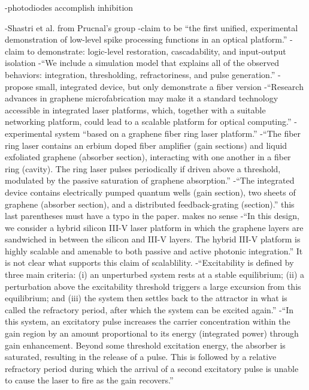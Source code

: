 \cite{shna2015}
-photodiodes accomplish inhibition

\cite{shna2016}
-Shastri et al. from Prucnal's group
-claim to be ``the first unified, experimental demonstration of low-level spike processing functions in an optical platform.''
-claim to demonstrate: logic-level restoration, cascadability, and input-output isolation
-``We include a simulation model that explains all of the observed behaviors: integration, thresholding, refractoriness, and pulse generation.''
-propose small, integrated device, but only demonstrate a fiber version
-``Research advances in graphene microfabrication may make it a standard technology accessible in integrated laser platforms, which, together with a suitable networking platform, could lead to a scalable platform for optical computing.''
-experimental system ``based on a graphene fiber ring laser platform.''
-``The fiber ring laser contains an erbium doped fiber amplifier (gain sections) and liquid exfoliated graphene (absorber section), interacting with one another in a fiber ring (cavity). The ring laser pulses periodically if driven above a threshold, modulated by the passive saturation of graphene absorption.''
-``The integrated device contains electrically pumped quantum wells (gain section), two sheets of graphene (absorber section), and a distributed feedback-grating (section).'' this last parentheses must have a typo in the paper. makes no sense
-``In this design, we consider a hybrid silicon III-V laser platform in which the graphene layers are sandwiched in between the silicon and III-V layers. The hybrid III-V platform is highly scalable and amenable to both passive and active photonic integration.'' It is not clear what supports this claim of scalablility.
-``Excitability is defined by three main criteria: (i) an unperturbed system rests at a stable equilibrium; (ii) a perturbation above the excitability threshold triggers a large excursion from this equilibrium; and (iii) the system then settles back to the attractor in what is called the refractory period, after which the system can be excited again.''
-``In this system, an excitatory pulse increases the carrier concentration within the gain region by an amount proportional to its energy (integrated power) through gain enhancement. Beyond some threshold excitation energy, the absorber is saturated, resulting in the release of a pulse. This is followed by a relative refractory period during which the arrival of a second excitatory pulse is unable to cause the laser to fire as the gain recovers.''
